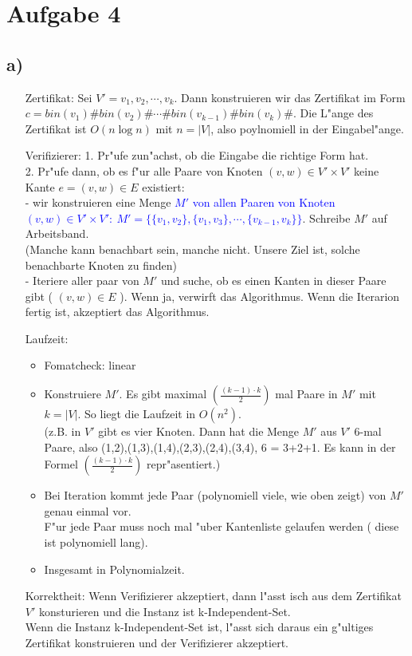 \documentclass[a4paper,11pt]{scrartcl}
\begin{document}
	
\section*{Aufgabe 4}
\subsection*{a)}
\begin{itemize}
	\item[Zertifikat:] Sei $V'={v_1,v_2,\cdots ,v_k}$. Dann konstruieren wir das Zertifikat im Form $c=bin(v_1)\# bin(v_2)\# \cdots \# bin(v_{k-1})\# bin(v_k)\#$. Die L"ange des Zertifikat ist $O(n \log n)$ mit $n=|V|$, also poylnomiell in der Eingabel"ange.
	\item [Verifizierer:] 1. Pr"ufe zun"achst, ob die Eingabe die richtige Form hat.\\
	2. Pr"ufe dann, ob es f"ur alle Paare von Knoten $(v,w)\in V'\times V'$ keine Kante $e=(v,w)\in E$ existiert:\\
	- wir konstruieren eine Menge \textcolor{blue}{$M'$ von allen Paaren von Knoten $(v,w)\in V' \times V':\ M'=\{\{v_1,v_2\},\{v_1,v_3\},\cdots,\{v_{k-1},v_{k}\}\}$}. Schreibe $M'$ auf Arbeitsband.\\ (Manche kann benachbart sein, manche nicht. Unsere Ziel ist, solche benachbarte Knoten zu finden)\\
	- Iteriere aller paar von $M'$ und suche, ob es einen Kanten in dieser Paare gibt ( $(v,w)\in E$ ). Wenn ja, verwirft das Algorithmus. Wenn die Iterarion fertig ist, akzeptiert das Algorithmus.
	\item [Laufzeit:]
	\begin{itemize}
		\item Fomatcheck: linear
		\item Konstruiere $M'$. Es gibt maximal $(\frac{(k-1)\cdot k}{2})$ mal Paare in $M'$ mit $k=|V|$. So liegt die Laufzeit in $O(n^2)$. \\
		(z.B. in $V'$ gibt es vier Knoten. Dann hat die Menge $M'$ aus $V'$ 6-mal Paare, also (1,2),(1,3),(1,4),(2,3),(2,4),(3,4), 6 = 3+2+1. Es kann in der Formel $(\frac{(k-1)\cdot k}{2})$ repr"asentiert.)
		\item Bei Iteration kommt jede Paar (polynomiell viele, wie oben zeigt) von $M'$ genau einmal vor.\\
		F"ur jede Paar muss noch mal "uber Kantenliste gelaufen werden ( diese ist polynomiell lang).
		\item Insgesamt in Polynomialzeit.
	\end{itemize}


	\item[Korrektheit:] Wenn Verifizierer akzeptiert, dann l"asst isch aus dem Zertifikat $V'$ konsturieren und die Instanz ist k-Independent-Set.\\
	Wenn die Instanz k-Independent-Set ist, l"asst sich daraus ein g"ultiges Zertifikat konstruieren und der Verifizierer akzeptiert.
	
 
\end{itemize}
\end{document}
